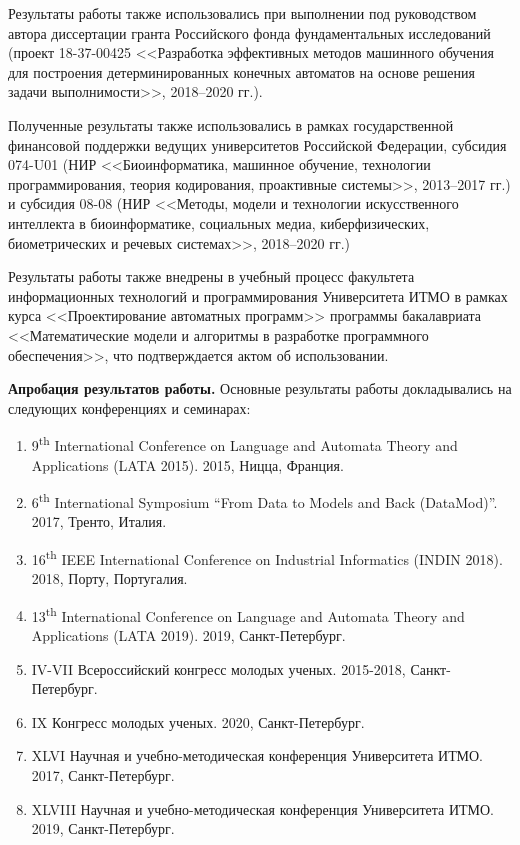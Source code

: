 Результаты работы также использовались при выполнении под руководством автора диссертации гранта Российского фонда фундаментальных исследований (проект 18-37-00425 <<Разработка эффективных методов машинного обучения для построения детерминированных конечных автоматов на основе решения задачи выполнимости>>, 2018--2020 гг.).

Полученные результаты также использовались в рамках государственной финансовой поддержки ведущих университетов Российской Федерации, субсидия 074-U01 (НИР <<Биоинформатика, машинное обучение, технологии программирования, теория кодирования, проактивные системы>>, 2013--2017 гг.) и субсидия 08-08 (НИР <<Методы, модели и технологии искусственного интеллекта в биоинформатике, социальных медиа, киберфизических, биометрических и речевых системах>>, 2018--2020 гг.)

Результаты работы также внедрены в учебный процесс факультета информационных технологий и программирования Университета ИТМО в рамках курса <<Проектирование автоматных программ>> программы бакалавриата <<Математические модели и алгоритмы в разработке программного обеспечения>>, что подтверждается актом об использовании.

\textbf{Апробация результатов работы.}
Основные результаты работы докладывались на следующих конференциях и семинарах:
\begin{enumerate}
  \item 9\textsuperscript{th} International Conference on Language and Automata Theory and Applications (LATA 2015). 2015, Ницца, Франция.
  \item 6\textsuperscript{th} International Symposium ``From Data to Models and Back (DataMod)''. 2017, Тренто, Италия.
  \item 16\textsuperscript{th} IEEE International Conference on Industrial Informatics (INDIN 2018). 2018, Порту, Португалия.
  \item 13\textsuperscript{th} International Conference on Language and Automata Theory and Applications (LATA 2019). 2019, Санкт-Петербург.
  \item IV-VII Всероссийский конгресс молодых ученых. 2015-2018, Санкт-Петербург.
  \item IX Конгресс молодых ученых. 2020, Санкт-Петербург.
  \item XLVI Научная и учебно-методическая конференция Университета \mbox{ИТМО}. 2017, Санкт-Петербург.
  \item XLVIII Научная и учебно-методическая конференция Университета ИТМО. 2019, Санкт-Петербург.
\end{enumerate}

